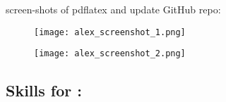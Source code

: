 \usepackage{blindtext}
\usepackage[T1]{fontenc}
\usepackage[utf8]{inputenc}
\usepackage{titlesec}
\usepackage{fancyhdr}
\usepackage{geometry}
\usepackage{fix-cm}
\usepackage[hidelinks]{hyperref}
\usepackage{graphicx}
\usepackage{multirow}
\usepackage[english]{babel}
\usepackage{float}
\usepackage{caption}
\usepackage{xcolor}

\captionsetup{
    font=small,
    labelfont=bf,
    textfont=it,
    labelsep=period,
    justification=centering,
    format=hang
}


\bigskip

screen-shots of pdflatex and update GitHub repo:
\begin{figure}[H]
    \centering
    \begin{minipage}{0.45\textwidth}
        \centering
        \texttt{[image: alex\_screenshot\_1.png]}
        \label{fig:pdflatex}
    \end{minipage}
    \hfill
    \begin{minipage}{0.45\textwidth}
        \centering
        \texttt{[image: alex\_screenshot\_2.png]}
        \label{fig:update_github}
    \end{minipage}
\end{figure}

\subsection{Skills for \majB: \studB} 